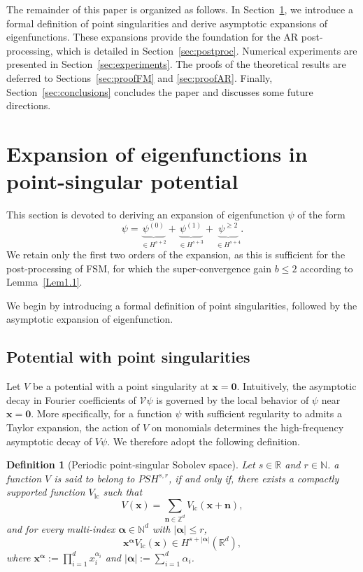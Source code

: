 \documentclass{sn-jnl}%
\numberwithin{equation}{section}
\theoremstyle{thmstyleone}%
\theoremstyle{thmstyletwo}%
\theoremstyle{thmstylethree}%
\newtheorem{definition}{Definition}%
\begin{document}
The remainder of this paper is organized as follows. 
In Section~\ref{sec:expansion}, we introduce a formal definition of point singularities and derive asymptotic expansions of eigenfunctions. 
These expansions provide the foundation for the AR post-processing, which is detailed in Section~\ref{sec:postproc}. 
Numerical experiments are presented in Section~\ref{sec:experiments}. 
The proofs of the theoretical results are deferred to Sections~\ref{sec:proofFM} and \ref{sec:proofAR}. 
Finally, Section~\ref{sec:conclusions} concludes the paper and discusses some future directions.


\section{Expansion of eigenfunctions in point-singular potential}
\label{sec:expansion}
This section is devoted to deriving an expansion of eigenfunction $\psi$ of the form
\begin{equation}\label{Eq-2.0-01}
\psi =
\underbrace{\psi^{(0)}}_{\in H^{s+2}}
+
\underbrace{\psi^{(1)}}_{\in H^{s+3}}
+
\underbrace{\psi^{\geq 2}}_{\in H^{s+4}}.
\end{equation}
We retain only the first two orders of the expansion, as this is sufficient for the post-processing of FSM, for which the super-convergence gain $b \leq 2$ according to Lemma~\ref{Lem1.1}.

We begin by introducing a formal definition of point singularities, followed by the asymptotic expansion of eigenfunction.


\subsection{Potential with point singularities}
Let $V$ be a potential with a point singularity at $\bm x=\bm 0$.  Intuitively, the asymptotic decay in Fourier coefficients of $\mathcal{{V}}\psi$ is governed by the local behavior
of $\psi$ near $\bm x=\bm 0$. More specifically, for a function $\psi$ with sufficient regularity to admits a Taylor expansion, the action of $V$ on monomials determines the high-frequency asymptotic decay of $V\psi$. 
We therefore adopt the following definition.
\begin{definition}[Periodic point‑singular Sobolev space]\label{Def01}
   Let $s\in\mathbb R$ and $r\in\mathbb N$. 
    a function $V$ is said to belong to $PSH^{s,r}$, if and only if, there exists a compactly supported function $V_{\mathrm{lc}} $ such that
    \begin{equation}\label{Eq-defPSH-01}
        V(\bm{x})
        =
        \sum_{\bm n \in \mathbb{Z}^d}
        V_{\mathrm{lc}}(\bm{x}+\bm n),
    \end{equation}
    and  for every multi-index  $\bm{\alpha} \in \mathbb{N}^{d}$ with $|\bm{\alpha}| \le r$, 
    \begin{equation}\label{Eq-defPSH-02}
    \bm x^{\bm \alpha}V_{\mathrm{lc}}(\bm x) \in H^{s+|\bm \alpha|}(\mathbb{R}^d),
    \end{equation}
    where $\bm x^{\bm \alpha} := \prod_{i=1}^d x_i^{\alpha_i}$ and $|\bm \alpha| := \sum_{i=1}^{d}\alpha_i$. 
\end{definition}
\end{document}
